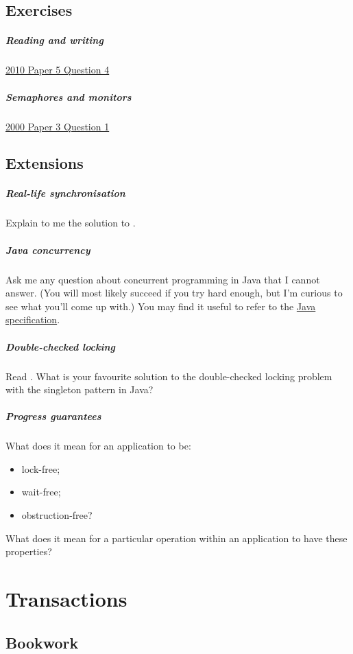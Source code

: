 \documentclass[12pt,a4paper,oneside,openright]{report}
\newcommand{\question}[2]{\paragraph{#1} #2}
\begin{document}
\section{Exercises}

\question{Reading and
  writing}{\href{https://www.cl.cam.ac.uk/teaching/exams/pastpapers/y2010p5q4.pdf}{2010
    Paper 5 Question 4}}

\question{Semaphores and
  monitors}{\href{https://www.cl.cam.ac.uk/teaching/exams/pastpapers/y2000p3q1.pdf}{2000
    Paper 3 Question 1}}

\section{Extensions}

\question{Real-life synchronisation}{Explain to me the solution to
  \cite[Chapter~1,~Exercise~4]{ArtMultiprocessorProgramming}.}

\question{Java concurrency}{Ask me any question about concurrent
  programming in Java that I cannot answer. (You will most likely
  succeed if you try hard enough, but I'm curious to see what you'll
  come up with.) You may find it useful to refer to the
  \href{https://docs.oracle.com/javase/specs/jls/se15/html/jls-17.html}{Java
    specification}.}

\question{Double-checked locking}{Read \cite{DCL}. What is your
  favourite solution to the double-checked locking problem with the
  singleton pattern in Java?}

\question{Progress guarantees}{What does it mean for an application to
  be:
  \begin{itemize}
  \item lock-free;
  \item wait-free;
  \item obstruction-free?
  \end{itemize}
  What does it mean for a particular operation within an application
  to have these properties?  }

\chapter{Transactions}

\section{Bookwork}
\end{document}
